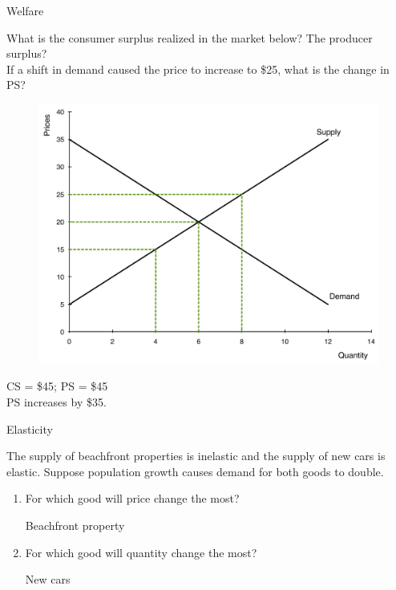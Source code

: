 \documentclass[pdf, handout]{beamer}
\begin{document}
\begin{frame}{Welfare}
	
What is the consumer surplus realized in the market below? The producer surplus?
\\
If a shift in demand caused the price to increase to \$25, what is the change in PS?

\begin{figure}[H]
	\centering
	\includegraphics[scale=.25]{Exam_Review3.pdf}
\end{figure}

\pause
\begin{flushright}
	
	\color{red} CS = \$45; PS = \$45
	\\
	PS increases by \$35.
\end{flushright}
	
\end{frame}

\begin{frame}{Elasticity}
	
The supply of beachfront properties is inelastic and the supply of new cars is elastic. Suppose population growth causes demand for both goods to double.

\begin{enumerate}
	\item For which good will price change the most?
	
	\pause
	\begin{flushright}
		
		\color{red} Beachfront property
	\end{flushright}
	
	\pause 
	\item For which good will quantity change the most?
	
	\pause
	\begin{flushright}
		
		\color{red} New cars
	\end{flushright}
	
\end{enumerate}
	
\end{frame}
\end{document}
